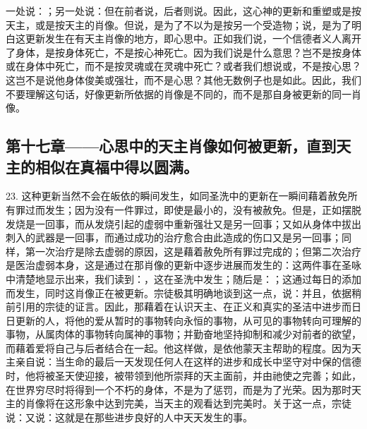 一处说：；另一处说：但在前者说，后者则说。因此，这心神的更新和重塑或是按天主，或是按天主的肖像。但说，是为了不以为是按另一个受造物；说，是为了明白这更新发生在有天主肖像的地方，即心思中。正如我们说，一个信德者义人离开了身体，是按身体死亡，不是按心神死亡。因为我们说是什么意思？岂不是按身体或在身体中死亡，而不是按灵魂或在灵魂中死亡？或者我们想说或，不是按心思？这岂不是说他身体俊美或强壮，而不是心思？其他无数例子也是如此。因此，我们不要理解这句话，好像更新所依据的肖像是不同的，而不是那自身被更新的同一肖像。\par


\subsection{第十七章——心思中的天主肖像如何被更新，直到天主的相似在真福中得以圆满。}

23. 这种更新当然不会在皈依的瞬间发生，如同圣洗中的更新在一瞬间藉着赦免所有罪过而发生；因为没有一件罪过，即使是最小的，没有被赦免。但是，正如摆脱发烧是一回事，而从发烧引起的虚弱中重新强壮又是另一回事；又如从身体中拔出刺入的武器是一回事，而通过成功的治疗愈合由此造成的伤口又是另一回事；同样，第一次治疗是除去虚弱的原因，这是藉着赦免所有罪过完成的；但第二次治疗是医治虚弱本身，这是通过在那肖像的更新中逐步进展而发生的：这两件事在圣咏中清楚地显示出来，我们读到：，这在圣洗中发生；随后是：；这通过每日的添加而发生，同时这肖像正在被更新。宗徒极其明确地谈到这一点，说：并且，依据稍前引用的宗徒的证言。因此，那藉着在认识天主、在正义和真实的圣洁中进步而日日更新的人，将他的爱从暂时的事物转向永恒的事物，从可见的事物转向可理解的事物，从属肉体的事物转向属神的事物；并勤奋地坚持抑制和减少对前者的欲望，而藉着爱将自己与后者结合在一起。他这样做，是依他蒙天主帮助的程度。因为天主亲自说：当生命的最后一天发现任何人在这样的进步和成长中坚守对中保的信德时，他将被圣天使迎接，被带领到他所崇拜的天主面前，并由祂使之完善；如此，在世界穷尽时将得到一个不朽的身体，不是为了惩罚，而是为了光荣。因为那时天主的肖像将在这形象中达到完美，当天主的观看达到完美时。关于这一点，宗徒说：又说：这就是在那些进步良好的人中天天发生的事。\par

